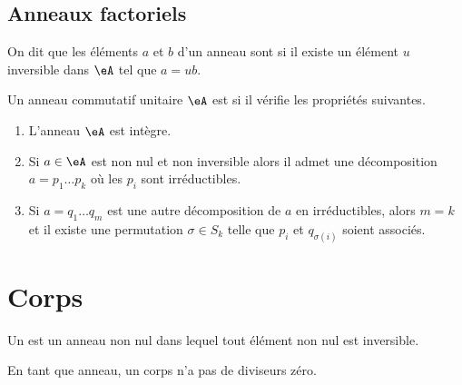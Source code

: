 \subsection{Anneaux factoriels}

On dit que les éléments \( a\) et \( b\) d'un anneau sont  si il existe un élément \( u\) inversible dans \( \eA\) tel que \( a=ub\).

\begin{definition}
    Un anneau commutatif unitaire \( \eA\) est  si il vérifie les propriétés suivantes.
    \begin{enumerate}
        \item
            L'anneau \( \eA\) est intègre.
        \item
            Si \( a\in \eA\) est non nul et non inversible alors il admet une décomposition \( a=p_1\ldots p_k\) où les \( p_i\) sont irréductibles.
        \item
            Si \( a=q_1\ldots q_m\) est une autre décomposition de \( a\) en irréductibles, alors \( m=k\) et il existe une permutation \( \sigma\in S_k\) telle que \( p_i\) et \( q_{\sigma(i)}\) soient associés.
    \end{enumerate}
\end{definition}

\section{Corps}

\begin{definition}
    Un  est un anneau non nul dans lequel tout élément non nul est inversible.
\end{definition}

\begin{lemma}       \label{LemAnnCorpsnonInterdivzer}
    En tant que anneau, un corps n'a pas de diviseurs zéro.
\end{lemma}

